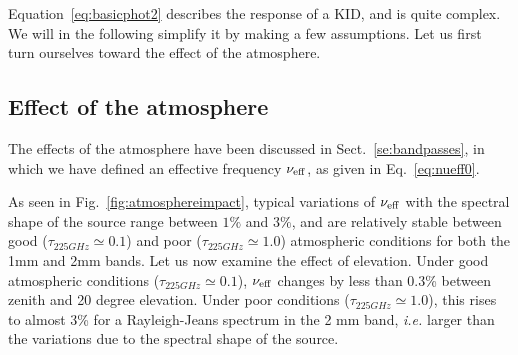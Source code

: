 Equation~\ref{eq:basicphot2} describes the response of a KID, and  
is quite complex. We will in the following simplify it by making a few
assumptions. Let us first turn ourselves toward the effect of the
atmosphere. 


\subsection{Effect of the atmosphere}

The effects of the atmosphere have been discussed in
Sect.~\ref{se:bandpasses}, in which we have defined an
effective frequency $\nu_{\rm{eff}}$, as given in
Eq.~\ref{eq:nueff0}. 





As seen in Fig.~\ref{fig:atmosphereimpact}, typical variations of $\nu_{\rm{eff}}$ with the spectral shape of the
source range between $1\%$ and $3\%$, and are relatively stable
between good ($\tau_{225GHz} \simeq 0.1$) and
poor  ($\tau_{225GHz} \simeq 1.0$) atmospheric conditions for both the
1mm and 2mm bands. Let us now examine the effect of elevation.
Under good atmospheric conditions ($\tau_{225GHz} \simeq 0.1$), $\nu_{\rm{eff}}$ changes by
less than 0.3\% between zenith and 20 degree elevation. Under poor
conditions ($\tau_{225GHz} \simeq 1.0$), this rises to almost 3\% for
a Rayleigh-Jeans spectrum in the 2 mm band, {\it i.e.} larger than the
variations due to the spectral shape of the source.

